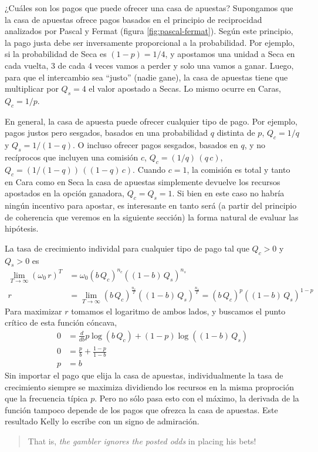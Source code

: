 \documentclass[a4paper,10pt]{book}
\theoremstyle{definition}1
\begin{document}

¿Cuáles son los pagos que puede ofrecer una casa de apuestas?
%
Supongamos que la casa de apuestas ofrece pagos basados en el principio de reciprocidad analizados por Pascal y Fermat (figura \ref{fig:pascal-fermat}).
%
Según este principio, la pago justa debe ser inversamente proporcional a la probabilidad.
%
Por ejemplo, si la probabilidad de Seca es $(1-p) = 1/4$, y apostamos una unidad a Seca en cada vuelta, $3$ de cada $4$ veces vamos a perder y solo una vamos a ganar.
%
Luego, para que el intercambio sea ``justo'' (nadie gane), la casa de apuestas tiene que multiplicar por $Q_s = 4$ el valor apostado a Secas.
%
Lo mismo ocurre en Caras, $Q_c = 1/p$.


En general, la casa de apuesta puede ofrecer cualquier tipo de pago.
%
Por ejemplo, pagos justos pero sesgados, basados en una probabilidad $q$ distinta de $p$, $Q_c = 1/q$ y $Q_s = 1/(1-q)$.
%
O incluso ofrecer pagos sesgados, basados en $q$, y no recíprocos que incluyen una comisión $c$, $Q_c = (1/q)\,(q\,c)$, $Q_c = (1/(1-q))\,((1-q)\,c)$.
%
Cuando $c = 1$, la comisión es total y tanto en Cara como en Seca la casa de apuestas simplemente devuelve los recursos apostados en la opción ganadora, $Q_c = Q_s = 1$.
%
Si bien en este caso no habría ningún incentivo para apostar, es interesante en tanto será (a partir del principio de coherencia que veremos en la siguiente sección) la forma natural de evaluar las hipótesis. 


La tasa de crecimiento individal para cualquier tipo de pago tal que $Q_c > 0$ y $Q_s > 0$ es
%
\begin{equation}
\begin{split}
\lim_{T \rightarrow \infty } (\omega_0 \, r)^T &= \omega_0 (b \, Q_c)^{n_c} ((1-b) \, Q_s )^{n_s} \\
r &= \lim_{T \rightarrow \infty } (b \, Q_c)^{\frac{n_c}{T}} ((1-b) \, Q_s )^{\frac{n_s}{T}} = (b \, Q_c)^{p} ((1-b) \, Q_s )^{1-p}
\end{split}
\end{equation}
%
Para maximizar $r$ tomamos el logaritmo de ambos lados, y buscamos el punto crítico de esta función cóncava,
%
\begin{equation}
\begin{split}
0 &= \frac{d}{db} p \log (b \, Q_c) + (1-p) \log ((1-b) \, Q_s) \\
0 &= \frac{p}{b} + \frac{1-p}{1-b} \\
p &= b 
\end{split}
\end{equation}
%
Sin importar el pago que elija la casa de apuestas, individualmente la tasa de crecimiento siempre se maximiza dividiendo los recursos en la misma proproción que la frecuencia típica $p$.
%
Pero no sólo pasa esto con el máximo, la derivada de la función tampoco depende de los pagos que ofrezca la casa de apuestas.
%
Este resultado Kelly lo escribe con un signo de admiración.
%
\begin{quotation}
That is, \emph{the gambler ignores the posted odds} in placing his bets!
\end{quotation}
\end{document}
